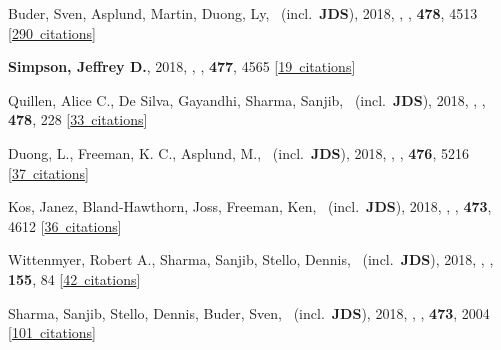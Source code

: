 \item[{\color{numcolor}\scriptsize19}] Buder, Sven, Asplund, Martin, Duong, Ly, \etal\ (incl.\ \textbf{JDS}), 2018, , \mnras, \textbf{478}, 4513 [\href{https://ui.adsabs.harvard.edu/#abs/2018MNRAS.478.4513B}{290~citations}]

\item[{\color{numcolor}\scriptsize18}] \textbf{Simpson, Jeffrey D.}, 2018, , \mnras, \textbf{477}, 4565 [\href{https://ui.adsabs.harvard.edu/#abs/2018MNRAS.477.4565S}{19~citations}]

\item[{\color{numcolor}\scriptsize17}] Quillen, Alice C., De Silva, Gayandhi, Sharma, Sanjib, \etal\ (incl.\ \textbf{JDS}), 2018, , \mnras, \textbf{478}, 228 [\href{https://ui.adsabs.harvard.edu/#abs/2018MNRAS.478..228Q}{33~citations}]

\item[{\color{numcolor}\scriptsize16}] Duong, L., Freeman, K. C., Asplund, M., \etal\ (incl.\ \textbf{JDS}), 2018, , \mnras, \textbf{476}, 5216 [\href{https://ui.adsabs.harvard.edu/#abs/2018MNRAS.476.5216D}{37~citations}]

\item[{\color{numcolor}\scriptsize15}] Kos, Janez, Bland-Hawthorn, Joss, Freeman, Ken, \etal\ (incl.\ \textbf{JDS}), 2018, , \mnras, \textbf{473}, 4612 [\href{https://ui.adsabs.harvard.edu/#abs/2018MNRAS.473.4612K}{36~citations}]

\item[{\color{numcolor}\scriptsize14}] Wittenmyer, Robert A., Sharma, Sanjib, Stello, Dennis, \etal\ (incl.\ \textbf{JDS}), 2018, , \aj, \textbf{155}, 84 [\href{https://ui.adsabs.harvard.edu/#abs/2018AJ....155...84W}{42~citations}]

\item[{\color{numcolor}\scriptsize13}] Sharma, Sanjib, Stello, Dennis, Buder, Sven, \etal\ (incl.\ \textbf{JDS}), 2018, , \mnras, \textbf{473}, 2004 [\href{https://ui.adsabs.harvard.edu/#abs/2018MNRAS.473.2004S}{101~citations}]

